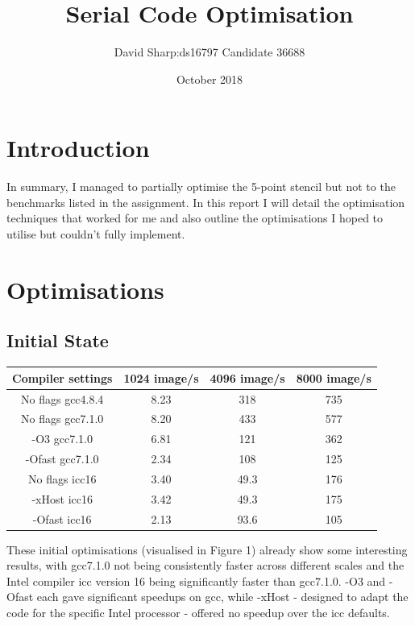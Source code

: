 \documentclass{article}
\title{Serial Code Optimisation}
\author{David Sharp:ds16797 Candidate 36688}
\date{October 2018}
\begin{document}
    \maketitle
    \section{Introduction}
    In summary, I managed to partially optimise the 5-point stencil but not to the benchmarks listed in the assignment.
    In this report I will detail the optimisation techniques that worked for me and also outline the optimisations I hoped to utilise
    but couldn't fully implement.
    \section{Optimisations}
    \subsection{Initial State}
    \begin{center}
    \begin{tabular}{| c | c | c | c |}
    Compiler settings & 1024 image/s & 4096 image/s & 8000 image/s \\ \hline
    No flags gcc4.8.4 & 8.23 & 318 & 735 \\
    No flags gcc7.1.0 & 8.20 & 433 & 577 \\
    -O3 gcc7.1.0 & 6.81 & 121 & 362 \\
    -Ofast gcc7.1.0 & 2.34 & 108 & 125 \\
    No flags icc16 & 3.40 & 49.3 & 176 \\
    -xHost icc16 & 3.42 & 49.3 & 175 \\
    -Ofast icc16 & 2.13 & 93.6 & 105
    \end{tabular}
    \end{center}
    These initial optimisations (visualised in Figure 1) already show some interesting results, with gcc7.1.0 not being consistently faster across different scales and the Intel
    compiler icc version 16 being significantly faster than gcc7.1.0.
    -O3 and -Ofast each gave significant speedups on gcc, while -xHost - designed to adapt the code for the specific Intel processor - offered no speedup
    over the icc defaults.
    
\end{document}

